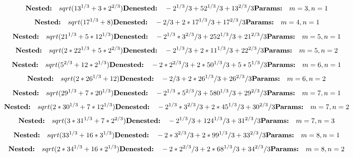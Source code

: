 
\[
\textbf{Nested:}\quad sqrt(13^{1/3} + 3*2^{2/3}) \\
\textbf{Denested:}\quad -2^{1/3}/3 + 52^{1/3}/3 + 13^{2/3}/3 \\
\textbf{Params:}\quad m=3, n=1
\]
\[
\textbf{Nested:}\quad sqrt(17^{1/3} + 8) \\
\textbf{Denested:}\quad -2/3 + 2*17^{1/3}/3 + 17^{2/3}/3 \\
\textbf{Params:}\quad m=4, n=1
\]
\[
\textbf{Nested:}\quad sqrt(21^{1/3} + 5*12^{1/3}) \\
\textbf{Denested:}\quad -2^{1/3}*3^{2/3}/3 + 252^{1/3}/3 + 21^{2/3}/3 \\
\textbf{Params:}\quad m=5, n=1
\]
\[
\textbf{Nested:}\quad sqrt(2*22^{1/3} + 5*2^{2/3}) \\
\textbf{Denested:}\quad -2^{1/3}/3 + 2*11^{1/3}/3 + 22^{2/3}/3 \\
\textbf{Params:}\quad m=5, n=2
\]
\[
\textbf{Nested:}\quad sqrt(5^{2/3} + 12*2^{1/3}) \\
\textbf{Denested:}\quad -2*2^{2/3}/3 + 2*50^{1/3}/3 + 5*5^{1/3}/3 \\
\textbf{Params:}\quad m=6, n=1
\]
\[
\textbf{Nested:}\quad sqrt(2*26^{1/3} + 12) \\
\textbf{Denested:}\quad -2/3 + 2*26^{1/3}/3 + 26^{2/3}/3 \\
\textbf{Params:}\quad m=6, n=2
\]
\[
\textbf{Nested:}\quad sqrt(29^{1/3} + 7*20^{1/3}) \\
\textbf{Denested:}\quad -2^{1/3}*5^{2/3}/3 + 580^{1/3}/3 + 29^{2/3}/3 \\
\textbf{Params:}\quad m=7, n=1
\]
\[
\textbf{Nested:}\quad sqrt(2*30^{1/3} + 7*12^{1/3}) \\
\textbf{Denested:}\quad -2^{1/3}*3^{2/3}/3 + 2*45^{1/3}/3 + 30^{2/3}/3 \\
\textbf{Params:}\quad m=7, n=2
\]
\[
\textbf{Nested:}\quad sqrt(3*31^{1/3} + 7*2^{2/3}) \\
\textbf{Denested:}\quad -2^{1/3}/3 + 124^{1/3}/3 + 31^{2/3}/3 \\
\textbf{Params:}\quad m=7, n=3
\]
\[
\textbf{Nested:}\quad sqrt(33^{1/3} + 16*3^{1/3}) \\
\textbf{Denested:}\quad -2*3^{2/3}/3 + 2*99^{1/3}/3 + 33^{2/3}/3 \\
\textbf{Params:}\quad m=8, n=1
\]
\[
\textbf{Nested:}\quad sqrt(2*34^{1/3} + 16*2^{1/3}) \\
\textbf{Denested:}\quad -2*2^{2/3}/3 + 2*68^{1/3}/3 + 34^{2/3}/3 \\
\textbf{Params:}\quad m=8, n=2
\]
